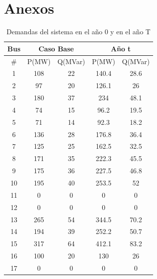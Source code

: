 \documentclass{article}
\begin{document}
\section{Anexos}
\begin{table}[H]
\centering
\caption{Demandas del sistema en el año 0 y en el año T }
\begin{tabular}{|c|c|c|c|c|}
\hline


Bus & \multicolumn{2}{c|}{Caso Base} & \multicolumn{2}{c|}{Año t} \\ \hline
\#  & P(MW)         & Q(MVar)        & P(MW)       & Q(MVar)      \\ \hline
1   & 108           & 22             & 140.4       & 28.6         \\ \hline
2   & 97            & 20             & 126.1       & 26           \\ \hline
3   & 180           & 37             & 234         & 48.1         \\ \hline
4   & 74            & 15             & 96.2        & 19.5         \\ \hline
5   & 71            & 14             & 92.3        & 18.2         \\ \hline
6   & 136           & 28             & 176.8       & 36.4         \\ \hline
7   & 125           & 25             & 162.5       & 32.5         \\ \hline
8   & 171           & 35             & 222.3       & 45.5         \\ \hline
9   & 175           & 36             & 227.5       & 46.8         \\ \hline
10  & 195           & 40             & 253.5       & 52           \\ \hline
11  & 0             & 0              & 0           & 0            \\ \hline
12  & 0             & 0              & 0           & 0            \\ \hline
13  & 265           & 54             & 344.5       & 70.2         \\ \hline
14  & 194           & 39             & 252.2       & 50.7         \\ \hline
15  & 317           & 64             & 412.1       & 83.2         \\ \hline
16  & 100           & 20             & 130         & 26           \\ \hline
17  & 0             & 0              & 0           & 0            \\ \hline

\end{tabular}
\end{table}
\end{document}
